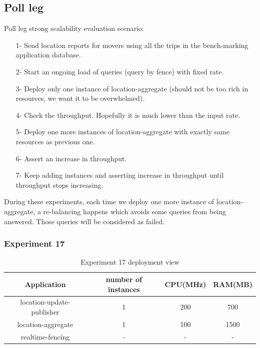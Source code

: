 \documentclass[a4]{report}
\begin{document}
    \subsection{Poll leg}
    Poll leg strong scalability evaluation scenario:
    \begin{itemize}
        \item[1-] Send location reports for movers using all the trips in the bench-marking application database.
        \item[2-] Start an ongoing load of queries (query by fence) with fixed rate.
        \item[3-] Deploy only one instance of location-aggregate (should not be too rich in resources, we want it to be
        overwhelmed).
        \item[4-] Check the throughput. Hopefully it is much lower than the input rate.
        \item[5-] Deploy one more instances of location-aggregate with exactly same resources as previous one.
        \item[6-] Assert an increase in throughput.
        \item[7-] Keep adding instances and asserting increase in throughput until throughput stops increasing.
    \end{itemize}

    During these experiments, each time we deploy one more instance of location-aggregate, a re-balancing happens which
    avoids some queries from being answered.
    Those queries will be considered as failed.

    \clearpage

    \subsubsection{Experiment 17}
    \begin{table}[h!]
        \centering
        \begin{tabular}{|c|c|c|c|}
            \hline
            Application               & number of instances & CPU(MHz) & RAM(MB) \\
            \hline
            location-update-publisher & 1                   & 200      & 700     \\
            location-aggregate        & 1                   & 100      & 1500    \\
            realtime-fencing          & -                   & -        & -       \\
            \hline
        \end{tabular}
        \caption{Experiment 17 deployment view}
        \label{table:ex17-dv}
    \end{table}
\end{document}
